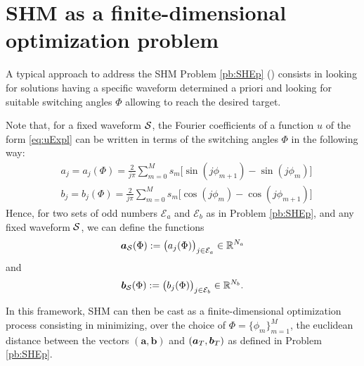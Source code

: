 \documentclass[twocolumn]{autart}    %
\begin{document}
\section{SHM as a finite-dimensional optimization problem}\label{sec:SHE_finite-dim_pbm}

A typical approach to address the SHM Problem \ref{pb:SHEp} (\cite{Yang2015,Konstantinou2010,Sun1996}) consists in looking for solutions having a specific waveform determined a priori and looking for suitable switching angles $\Phi$ allowing to reach the desired target. 

Note that, for a fixed waveform $\mathcal{S}$, the Fourier coefficients of a function $u$ of the form \eqref{eq:uExpl} can be written in terms of the switching angles $\Phi$ in the following way:
\begin{align*}
	& a_j = a_j(\Phi) =  \frac{2}{j\pi} \sum_{m=0}^{M} s_m \Big[\sin(j\phi_{m+1}) -\sin(j\phi_{m})\Big]
	\\[5pt]
	& b_j = b_j(\Phi) = \frac{2}{j\pi} \sum_{m=0}^{M} s_m \Big[\cos(j\phi_{m}) -\cos(j\phi_{m+1})\Big]
\end{align*}
Hence, for two sets of odd numbers $\mathcal{E}_a$ and $\mathcal{E}_b$ as in Problem \ref{pb:SHEp}, and any fixed waveform $\mathcal{S}$, we can define the functions
\begin{align*}
	\bm{a}_{\mathcal{S}} (\Phi) := \big(a_j (\Phi)\big)_{j\in \mathcal{E}_a} \in \mathbb{R}^{N_a}
\end{align*}
and
\begin{align*}
	\bm{b}_{\mathcal{S}} (\Phi) := \big(b_j (\Phi)\big)_{j\in \mathcal{E}_b} \in \mathbb{R}^{N_b}.
\end{align*}

In this framework, SHM can then be cast as a finite-dimensional optimization process consisting in minimizing, over the choice of $\Phi = \{\phi_m\}_{m=1}^{M}$, the euclidean distance between the vectors $(\bm{a}, \bm{b})$ and $(\bm{a}_T,\bm{b}_T)$ as defined in Problem \ref{pb:SHEp}.

\bigskip
\end{document}
